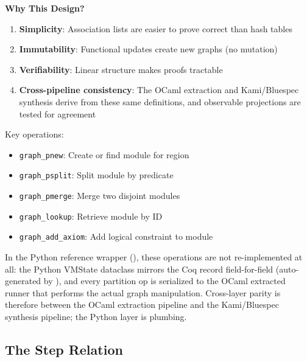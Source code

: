 \textbf{Why This Design?}
\begin{enumerate}
    \item \textbf{Simplicity}: Association lists are easier to prove correct than hash tables
    \item \textbf{Immutability}: Functional updates create new graphs (no mutation)
    \item \textbf{Verifiability}: Linear structure makes proofs tractable
    \item \textbf{Cross-pipeline consistency}: The OCaml extraction and Kami/Bluespec synthesis derive from these same definitions, and observable projections are tested for agreement
\end{enumerate}

Key operations:
\begin{itemize}
    \item \texttt{graph\_pnew}: Create or find module for region
    \item \texttt{graph\_psplit}: Split module by predicate
    \item \texttt{graph\_pmerge}: Merge two disjoint modules
    \item \texttt{graph\_lookup}: Retrieve module by ID
    \item \texttt{graph\_add\_axiom}: Add logical constraint to module
\end{itemize}
In the Python reference wrapper (), these operations are not re-implemented at all: the Python VMState dataclass mirrors the Coq record field-for-field (auto-generated by ), and every partition op is serialized to the OCaml extracted runner that performs the actual graph manipulation. Cross-layer parity is therefore between the OCaml extraction pipeline and the Kami/Bluespec synthesis pipeline; the Python layer is plumbing.

\subsection{The Step Relation}

